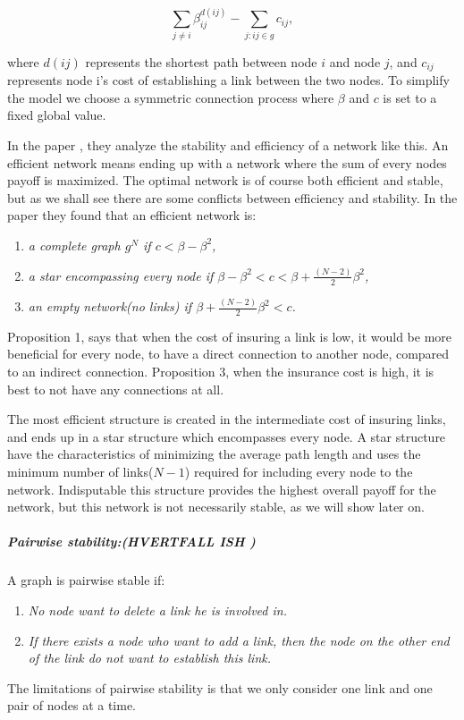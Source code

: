 \begin{equation}
\sum_{j\neq i}^{} \beta_{ij}^{d(ij)} - \sum_{j:ij\in g}^{} {c}_{ij}, 
\label{eq:connecetionGame}
\end{equation}

where $d(ij)$ represents the shortest path between node $i $ and node $j $, and ${c}_{ij}$ represents node i's cost of establishing a link between the two nodes. To simplify the model we choose a symmetric connection process where $\beta$ and $c$ is set to a fixed global value. 

In the paper \cite{jackson1996strategic}, they analyze the stability and efficiency of a network like this. An efficient network means ending up with a network where the sum of every nodes payoff is maximized. The optimal network is of course both efficient and stable, but as we shall see there are some conflicts between efficiency and stability. In the paper they found that an efficient network is:
\begin{enumerate}
\item \textit{a complete graph $g^N$ if $c<\beta - \beta^2$,}
\item \textit{a star encompassing every node if $\beta - \beta^2 < c < \beta + \frac{(N-2)}{2}\beta^2$,}
\item \textit{an empty network(no links) if $\beta + \frac{(N-2)}{2}\beta^2 < c$.}
\end{enumerate}

Proposition 1, says that when the cost of insuring a link is low, it would be more beneficial for every node, to have a direct connection to another node, compared to an indirect connection.
Proposition 3, when the insurance cost is high, it is best to not have any connections at all.

The most efficient structure is created in the intermediate cost of insuring links, and ends up in a star structure which encompasses every node. A star structure have the characteristics of minimizing the average path length and uses the minimum number of links($N-1$) required for including every node to the network. 
Indisputable this structure provides the highest overall payoff for the network, but this network is not necessarily stable, as we will show later on.

\subparagraph{Pairwise stability:(HVERTFALL ISH )}
A graph is pairwise stable if:
 \begin{enumerate}
\item \textit{No node want to delete a link he is involved in.}
\item \textit{If there exists a node who want to add a link, then the node on the other end of the link do not want to establish this link.}
\end{enumerate} 
The limitations of pairwise stability is that we only consider one link and one pair of nodes at a time.


